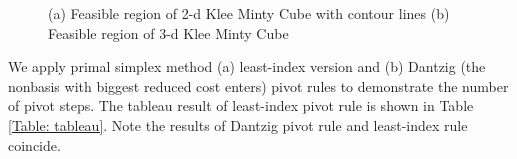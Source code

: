 \documentclass[11pt]{article}
\begin{document}
\begin{figure}
    \centering
    \caption{(a) Feasible region of 2-d Klee Minty Cube with contour lines (b) Feasible region of 3-d Klee Minty Cube}
    \label{fig:kmcube}
\end{figure}
We apply primal simplex method (a) least-index version and (b) Dantzig (the nonbasis with biggest reduced cost enters) pivot rules to demonstrate the number of pivot steps. The tableau result of least-index pivot rule is shown in Table \ref{Table: tableau}. Note the results of Dantzig pivot rule and least-index rule coincide.
\end{document}
